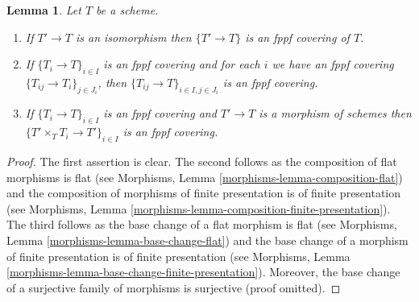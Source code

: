 \documentclass[10pt,a4paper]{amsart}
\theoremstyle{plain}
\newtheorem{lemma}[subsection]{Lemma}
\theoremstyle{definition}
\theoremstyle{remark}
\numberwithin{equation}{subsection}
\begin{document}
\begin{lemma}
\label{lemma-fppf}
Let $T$ be a scheme.
\begin{enumerate}
\item If $T' \to T$ is an isomorphism then $\{T' \to T\}$
is an fppf covering of $T$.
\item If $\{T_i \to T\}_{i\in I}$ is an fppf covering and for each
$i$ we have an fppf covering $\{T_{ij} \to T_i\}_{j\in J_i}$, then
$\{T_{ij} \to T\}_{i \in I, j\in J_i}$ is an fppf covering.
\item If $\{T_i \to T\}_{i\in I}$ is an fppf covering
and $T' \to T$ is a morphism of schemes then
$\{T' \times_T T_i \to T'\}_{i\in I}$ is an fppf covering.
\end{enumerate}
\end{lemma}

\begin{proof}
The first assertion is clear.
The second follows as the composition of flat morphisms is flat
(see Morphisms, Lemma \ref{morphisms-lemma-composition-flat})
and the composition of morphisms of finite presentation is
of finite presentation
(see Morphisms, Lemma \ref{morphisms-lemma-composition-finite-presentation}).
The third follows as the base change of a flat morphism is flat
(see Morphisms, Lemma \ref{morphisms-lemma-base-change-flat})
and the base change of a morphism of finite presentation is
of finite presentation
(see Morphisms, Lemma \ref{morphisms-lemma-base-change-finite-presentation}).
Moreover, the base change of a surjective family of morphisms is surjective
(proof omitted).
\end{proof}
\end{document}
